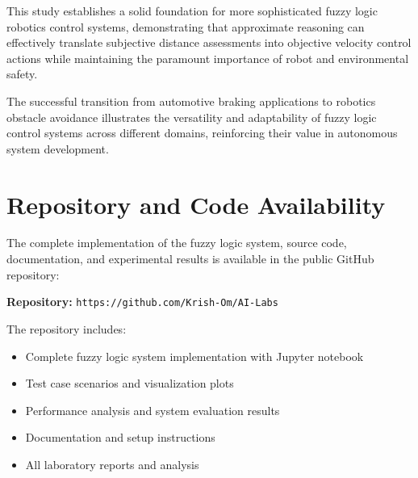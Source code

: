 \documentclass[11pt,a4paper]{article}
\begin{document}
This study establishes a solid foundation for more sophisticated fuzzy logic robotics control systems, demonstrating that approximate reasoning can effectively translate subjective distance assessments into objective velocity control actions while maintaining the paramount importance of robot and environmental safety.

The successful transition from automotive braking applications to robotics obstacle avoidance illustrates the versatility and adaptability of fuzzy logic control systems across different domains, reinforcing their value in autonomous system development.

\section{Repository and Code Availability}

The complete implementation of the fuzzy logic system, source code, documentation, and experimental results is available in the public GitHub repository:

\textbf{Repository:} \texttt{https://github.com/Krish-Om/AI-Labs}

The repository includes:
\begin{itemize}
\item Complete fuzzy logic system implementation with Jupyter notebook
\item Test case scenarios and visualization plots
\item Performance analysis and system evaluation results
\item Documentation and setup instructions
\item All laboratory reports and analysis
\end{itemize}
\end{document}
